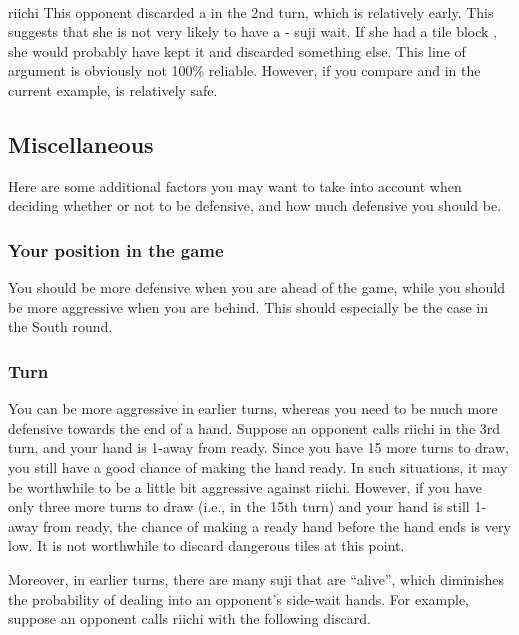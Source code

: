 {{\bp
\bei{}\fa{}\\
\hspace{127pt}\footnotesize{{\jap riichi}}
\ep
This opponent discarded a {\large{}} in the 2nd turn, which is relatively early. This suggests that she is not very likely to have a {\large{}-} {\jap suji} wait. If she had a tile block {\large{}}, she would probably have kept it and discarded something else. 
This line of argument is obviously not 100\% reliable. However, if you compare {\large{}} and {\large{}} in the current example, {\large{}} is relatively safe. 

\subsection{Miscellaneous}
Here are some additional factors you may want to take into account when deciding whether or not to be defensive, and how much defensive you should be. 

\subsubsection*{Your position in the game}
You should be more defensive when you are ahead of the game, while you should be more aggressive when you are behind. This should especially be the case in the South round. 

\subsubsection*{Turn}
You can be more aggressive in earlier turns, whereas you need to be much more defensive towards the end of a hand. Suppose an opponent calls {\jap riichi} in the 3rd turn, and your hand is 1-away from ready. Since you have 15 more turns to draw, you still have a good chance of making the hand ready. In such situations, it may be worthwhile to be a little bit aggressive against {\jap riichi}. 
However, if you have only three more turns to draw (i.e., in the 15th turn) and your hand is still 1-away from ready, the chance of making a ready hand before the hand ends is very low. It is not worthwhile to discard dangerous tiles at this point. 

\bigskip
Moreover, in earlier turns, there are many {\jap suji} that are ``alive'', which diminishes the probability of dealing into an opponent's side-wait hands. For example, suppose an opponent calls {\jap riichi} with the following discard. 

}}
